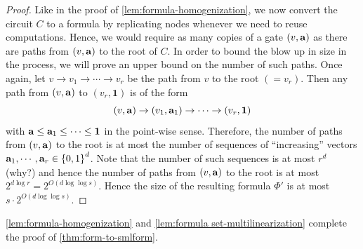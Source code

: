 \begin{proof}
Like in the proof of \autoref{lem:formula-homogenization}, we now convert the circuit $C$ to a formula by replicating nodes whenever we need to reuse computations.
Hence, we would require as many copies of a gate $(v, \mathbf{a})$ as there are paths from $(v,\mathbf{a})$ to the root of $C$.
In order to bound the blow up in size in the process, we will prove an upper bound on the number of such paths.
Once again, let $v \rightarrow v_1 \rightarrow \cdots \rightarrow v_r$ be the path from $v$ to the root $(=v_r)$.
Then any path from $(v,\mathbf{a})$ to $(v_r,\mathbf{1})$ is of the form
\[
(v,\mathbf{a}) \rightarrow (v_1,\mathbf{a}_1) \rightarrow \cdots \rightarrow (v_r,\mathbf{1})
\]
with $\mathbf{a} \leq \mathbf{a}_1 \leq \cdots \leq \mathbf{1}$ in the point-wise sense.
Therefore, the number of paths from $(v,\mathbf{a})$ to the root is at most the number of sequences of ``increasing'' vectors $\mathbf{a}_1, \cdots, \mathbf{a}_r \in \left\{0,1\right\}^d$. Note that the number of such sequences is at most $r^d$ (why?)
and hence the number of paths from $(v,\mathbf{a})$ to the root is at most $2^{d\log r} = 2^{O(d\log\log s)}$.
Hence the size of the resulting formula $\Phi'$ is at most $s \cdot 2^{O(d \log\log s)}$. 
\end{proof}

\autoref{lem:formula-homogenization} and \autoref{lem:formula set-multilinearization} complete the proof of \autoref{thm:form-to-smlform}. 
